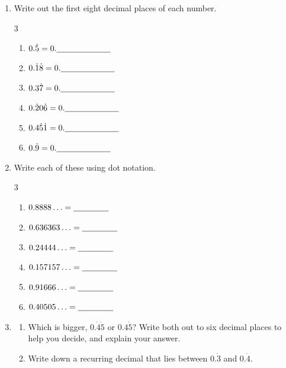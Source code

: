\documentclass[12pt,a4paper]{article}
\newcommand{\ansline}[1][2.2cm]{\underline{\hspace{#1}}}
\begin{document}
\begin{enumerate}

\item Write out the first eight decimal places of each number.
\begin{multicols}{3}
\begin{enumerate}
  \item $0.\dot{5}=0.\ansline[2.3cm]$
  \item $0.\dot{1}\dot{8}=0.\ansline[2.3cm]$
  \item $0.3\dot{7}=0.\ansline[2.3cm]$
  \item $0.\dot{2}0\dot{6}=0.\ansline[2.3cm]$
  \item $0.4\dot{5}\dot{1}=0.\ansline[2.3cm]$
  \item $0.\dot{9}=0.\ansline[2.3cm]$
\end{enumerate}
\end{multicols}

\vspace{1em}

\item Write each of these using dot notation.
\begin{multicols}{3}
\begin{enumerate}
  \item $0.8888\ldots=\ansline[1.5cm]$
  \item $0.636363\ldots=\ansline[1.5cm]$
  \item $0.24444\ldots=\ansline[1.5cm]$
  \item $0.157157\ldots=\ansline[1.5cm]$
  \item $0.91666\ldots=\ansline[1.5cm]$
  \item $0.40505\ldots=\ansline[1.5cm]$
\end{enumerate}
\end{multicols}

\vspace{1em}

\item
\begin{enumerate}
  \item Which is bigger, $0.\dot{4}\dot{5}$ or $0.4\dot{5}$? Write both out to
        six decimal places to help you decide, and explain your answer.

        \vspace{7em}
  \item Write down a recurring decimal that lies between $0.\dot{3}$ and
        $0.\dot{4}$. \ansline[3cm]
\end{enumerate}

\end{enumerate}
\end{document}
